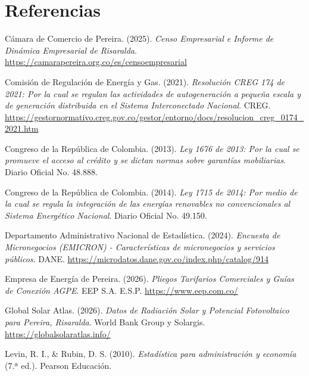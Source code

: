 \documentclass[12pt,letterpaper]{article}
\begin{document}
\section*{Referencias}

\begingroup
\small
\setlength{\parindent}{0pt}
\setlength{\hangindent}{1.27cm}
\newcommand{\refitem}[1]{ #1\vspace{0.25em}\par}

\refitem{Cámara de Comercio de Pereira. (2025). \textit{Censo Empresarial e Informe de Dinámica Empresarial de Risaralda}. \url{https://camarapereira.org.co/es/censoempresarial}}

\refitem{Comisión de Regulación de Energía y Gas. (2021). \textit{Resolución CREG 174 de 2021: Por la cual se regulan las actividades de autogeneración a pequeña escala y de generación distribuida en el Sistema Interconectado Nacional}. CREG. \url{https://gestornormativo.creg.gov.co/gestor/entorno/docs/resolucion_creg_0174_2021.htm}}

\refitem{Congreso de la República de Colombia. (2013). \textit{Ley 1676 de 2013: Por la cual se promueve el acceso al crédito y se dictan normas sobre garantías mobiliarias}. Diario Oficial No. 48.888.}

\refitem{Congreso de la República de Colombia. (2014). \textit{Ley 1715 de 2014: Por medio de la cual se regula la integración de las energías renovables no convencionales al Sistema Energético Nacional}. Diario Oficial No. 49.150.}

\refitem{Departamento Administrativo Nacional de Estadística. (2024). \textit{Encuesta de Micronegocios (EMICRON) - Características de micronegocios y servicios públicos}. DANE. \url{https://microdatos.dane.gov.co/index.php/catalog/914}}

\refitem{Empresa de Energía de Pereira. (2026). \textit{Pliegos Tarifarios Comerciales y Guías de Conexión AGPE}. EEP S.A. E.S.P. \url{https://www.eep.com.co/}}

\refitem{Global Solar Atlas. (2026). \textit{Datos de Radiación Solar y Potencial Fotovoltaico para Pereira, Risaralda}. World Bank Group y Solargis. \url{https://globalsolaratlas.info/}}

\refitem{Levin, R. I., \& Rubin, D. S. (2010). \textit{Estadística para administración y economía} (7.ª ed.). Pearson Educación.}
\endgroup
\end{document}

